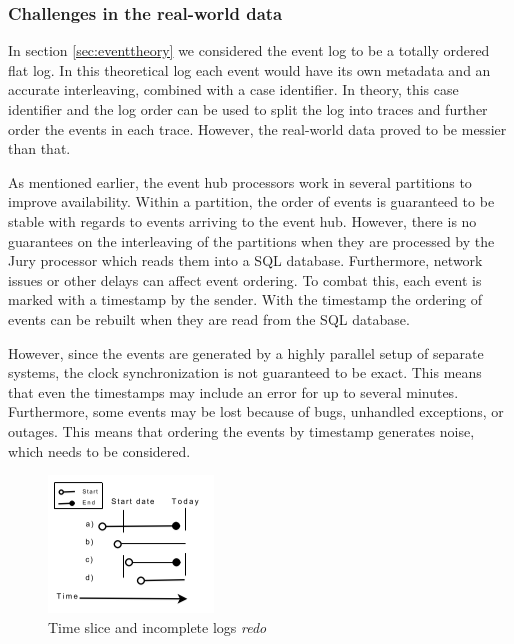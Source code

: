 \documentclass[english,12pt,a4paper,pdftex,sci,utf8]{aaltothesis}
\theoremstyle{definition}
\newcommand{\nyi}[1]{\noindent\colorbox{nyibg}{\textcolor{nyitext}{\emph{#1}}}}
\begin{document}
\subsubsection{Challenges in the real-world data}

In section \ref{sec:eventtheory} we considered the event log to be a totally ordered flat log. In this theoretical log each event would have its own metadata and an accurate interleaving, combined with a case identifier.
In theory, this case identifier and the log order can be used to split the log into traces and further order the events in each trace.
However, the real-world data proved to be messier than that. 

As mentioned earlier, the event hub processors work in several partitions to improve availability.
Within a partition, the order of events is guaranteed to be stable with regards to events arriving to the event hub. However, there is no guarantees on the interleaving of the partitions when they are processed by the Jury processor which reads them into a SQL database. Furthermore, network issues or other delays can affect event ordering. To combat this, each event is marked with a timestamp by the sender. With the timestamp the ordering of events can be rebuilt when they are read from the SQL database.

However, since the events are generated by a highly parallel setup of separate systems, the clock synchronization is not guaranteed to be exact. This means that even the timestamps may include an error for up to several minutes.
Furthermore, some events may be lost because of bugs, unhandled exceptions, or outages.
This means that ordering the events by timestamp generates noise, which needs to be considered.

\begin{figure}[htb]
\centering \includegraphics[width=0.5\linewidth]{gfx/slice.png}
\caption{Time slice and incomplete logs \nyi{redo}}
\label{fig:timeslice}
\end{figure}
\end{document}
